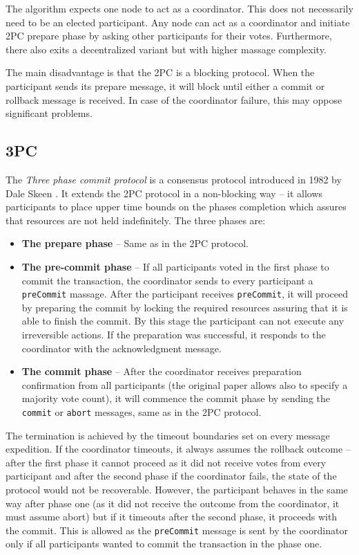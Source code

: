 \documentclass[oneside,
  digital, %
  table,   %
  nolof,     %
  nolot,     %
]{fithesis3}
\begin{document}
The algorithm expects one node to act as a coordinator. This does not necessarily need to be an elected participant. Any node can act as a coordinator and initiate 2PC prepare phase by asking other participants for their votes. Furthermore, there also exits a decentralized variant but with higher massage complexity.

The main disadvantage is that the 2PC is a blocking protocol. When the participant sends its prepare message, it will block until either a commit or rollback message is received. In case of the coordinator failure, this may oppose significant problems.

\subsection{3PC}

The \textit{Three phase commit protocol} is a consensus protocol introduced in 1982 by Dale Skeen \cite{3PC}. It extends the 2PC protocol in a non-blocking way -- it allows participants to place upper time bounds on the phases completion which assures that resources are not  held indefinitely. The three phases are:

\begin{itemize}
    \item \textbf{The prepare phase} -- Same as in the 2PC protocol.
    
    \item \textbf{The pre-commit phase} -- If all participants voted in the first phase to commit the transaction, the coordinator sends to every participant a \texttt{preCommit} massage. After the participant receives \texttt{preCommit}, it will proceed by preparing the commit by locking the required resources assuring that it is able to finish the commit. By this stage the participant can not execute any irreversible actions. If the preparation was successful, it responds to the coordinator with the acknowledgment message.
    
    \item \textbf{The commit phase} -- After the coordinator receives preparation confirmation from all participants (the original paper \cite{3PC} allows also to specify a majority vote count), it will commence the commit phase by sending the \texttt{commit} or \texttt{abort} messages, same as in the 2PC protocol.
\end{itemize}

The termination is achieved by the timeout boundaries set on every message expedition. If the coordinator timeouts, it always assumes the rollback outcome -- after the first phase it cannot proceed as it did not receive votes from every participant and after the second phase if the coordinator fails, the state of the protocol would not be recoverable. However, the participant behaves in the same way after phase one (as it did not receive the outcome from the coordinator, it must assume abort) but if it timeouts after the second phase, it proceeds with the commit. This is allowed as the \texttt{preCommit} message is sent by the coordinator only if all participants wanted to commit the transaction in the phase one.
\end{document}
